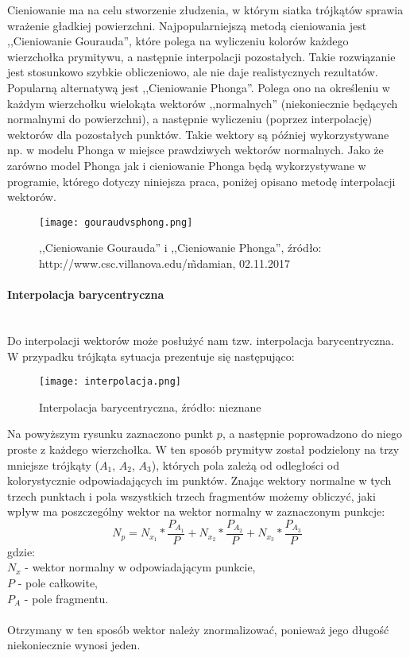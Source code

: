 Cieniowanie ma na celu stworzenie złudzenia, w którym siatka trójkątów sprawia wrażenie gładkiej powierzchni. Najpopularniejszą metodą cieniowania jest ,,Cieniowanie Gourauda'', które polega na wyliczeniu kolorów każdego wierzchołka prymitywu, a następnie interpolacji pozostałych. Takie rozwiązanie jest stosunkowo szybkie obliczeniowo, ale nie daje realistycznych rezultatów. Popularną alternatywą jest ,,Cieniowanie Phonga''. Polega ono na określeniu w każdym wierzchołku wielokąta wektorów ,,normalnych'' (niekoniecznie będących normalnymi do powierzchni), a następnie wyliczeniu (poprzez interpolację) wektorów dla pozostałych punktów. Takie wektory są później wykorzystywane np. w modelu Phonga w miejsce prawdziwych wektorów normalnych. Jako że zarówno model Phonga jak i cieniowanie Phonga będą wykorzystywane w programie, którego dotyczy niniejsza praca, poniżej opisano metodę interpolacji wektorów.

\begin{figure}[h!]
\centering
  \texttt{[image: gouraudvsphong.png]}
  \caption{,,Cieniowanie Gourauda'' i ,,Cieniowanie Phonga'', źródło: http://www.csc.villanova.edu/\~mdamian, 02.11.2017}
\end{figure}


\paragraph{Interpolacja barycentryczna}\mbox{} \\

Do interpolacji wektorów może posłużyć nam tzw. interpolacja barycentryczna. W przypadku trójkąta sytuacja prezentuje się następująco:

\begin{figure}[H]
\centering
  \texttt{[image: interpolacja.png]}
  \caption{Interpolacja barycentryczna, źródło: nieznane}
\end{figure}

Na powyższym rysunku zaznaczono punkt $p$, a następnie poprowadzono do niego proste z każdego wierzchołka. W ten sposób prymityw został podzielony na trzy mniejsze trójkąty ($A_1$, $A_2$, $A_3$), których pola zależą od odległości od kolorystycznie odpowiadających im punktów. Znając wektory normalne w tych trzech punktach i pola wszystkich trzech fragmentów możemy obliczyć, jaki wpływ ma poszczególny wektor na wektor normalny w zaznaczonym punkcje:
$$N_p = N_{x_1} * \frac{P_{A_1}}{P} + N_{x_2} * \frac{P_{A_2}}{P} + N_{x_3} * \frac{P_{A_3}}{P}$$
gdzie: \\
$N_x$ - wektor normalny w odpowiadającym punkcie, \\
$P$ - pole całkowite, \\ 
$P_A$ - pole fragmentu. \\
\\
Otrzymany w ten sposób wektor należy znormalizować, ponieważ jego długość niekoniecznie wynosi jeden.

